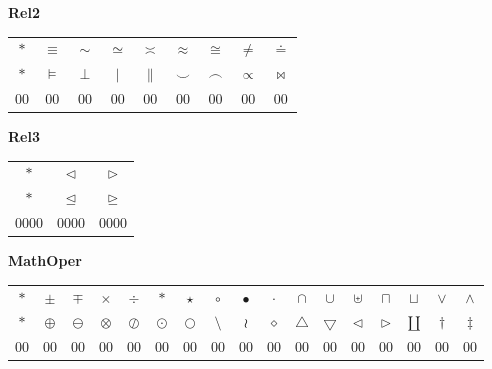 \documentclass[12pt]{report}
\newlength{\mine}
\newlength{\niz}
\def\pmb{}
\begin{document}
\textbf{Rel2}
\par\nobreak\vspace{2mm}
\begin{tabular}{|c|cccccccc|}
  \hline
   $\pmb *         $&
   $\pmb\equiv     $&
   $\pmb\sim       $&
   $\pmb\simeq     $&
   $\pmb\asymp     $&
   $\pmb\approx    $&
   $\pmb\cong      $&
   $\pmb\neq       $&
   $\pmb\doteq     $\\[\mine]
   $\pmb *         $&
   $\pmb\models    $&
   $\pmb\perp      $&
   $\pmb\mid       $&
   $\pmb\parallel  $&
   $\pmb\smile     $&
   $\pmb\frown     $&
   $\pmb\propto    $&
   $\pmb\bowtie    $\\[\niz]
  \hline\hline
  00&00&00&00&00&00&00&00&00\\
  \hline
\end{tabular}
\goodbreak\par\vspace{3mm}

\textbf{Rel3}
\par\nobreak\vspace{2mm}
\begin{tabular}{|c|cc|}
  \hline
   $\pmb *       $&
   $\pmb\lhd     $&
   $\pmb\rhd     $\\[\mine]
   $\pmb *       $&
   $\pmb\unlhd   $&
   $\pmb\unrhd   $\\[\niz]
  \hline\hline
  0000&0000&0000\\
  \hline
\end{tabular}
\goodbreak\par\vspace{3mm}

\newpage

\textbf{MathOper}
\par\nobreak\vspace{2mm}
\begin{tabular}{|c|cccccccccccccccc|}
  \hline
   $\pmb *              $&
   $\pmb\pm             $&
   $\pmb\mp             $&
   $\pmb\times          $&
   $\pmb\div            $&
   $\pmb\ast            $&
   $\pmb\star           $&
   $\pmb\circ           $&
   $\pmb\bullet         $&
   $\pmb\cdot           $&
   $\pmb\cap            $&
   $\pmb\cup            $&
   $\pmb\uplus          $&
   $\pmb\sqcap          $&
   $\pmb\sqcup          $&
   $\pmb\vee            $&
   $\pmb\wedge          $\\[\mine]
   $\pmb *              $&
   $\pmb\oplus          $&
   $\pmb\ominus         $&
   $\pmb\otimes         $&
   $\pmb\oslash         $&
   $\pmb\odot           $&
   $\pmb\bigcirc        $&
   $\pmb\setminus       $&
   $\pmb\wr             $&
   $\pmb\diamond        $&
   $\pmb\bigtriangleup  $&
   $\pmb\bigtriangledown$&
   $\pmb\triangleleft   $&
   $\pmb\triangleright  $&
   $\pmb\amalg          $&
   $\pmb\dagger         $&
   $\pmb\ddagger        $\\[\niz]
  \hline\hline
  00&00&00&00&00&00&00&00&00&00&00&00&00&00&00&00&00\\
  \hline
\end{tabular}
\goodbreak\par\vspace{3mm}
\end{document}
